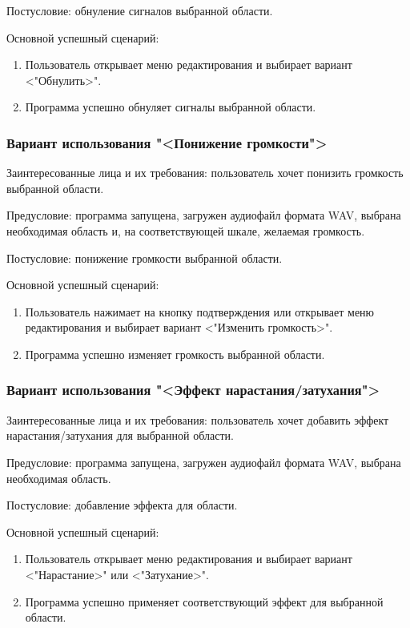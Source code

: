 Постусловие: обнуление сигналов выбранной области.

Основной успешный сценарий:
\begin{enumerate}
	\item Пользователь открывает меню редактирования и выбирает вариант <"Обнулить>".
	\item Программа успешно обнуляет сигналы выбранной области.
\end{enumerate} 

\subsubsection{Вариант использования "<Понижение громкости">}

Заинтересованные лица и их требования: пользователь хочет понизить громкость выбранной области.

Предусловие: программа запущена, загружен аудиофайл формата WAV, выбрана необходимая область и, на соответствующей шкале, желаемая громкость.

Постусловие: понижение громкости выбранной области.

Основной успешный сценарий:
\begin{enumerate}
	\item Пользователь нажимает на кнопку подтверждения или открывает меню редактирования и выбирает вариант <"Изменить громкость>".
	\item Программа успешно изменяет громкость выбранной области.
\end{enumerate} 

\subsubsection{Вариант использования "<Эффект нарастания/затухания">}

Заинтересованные лица и их требования: пользователь хочет добавить эффект нарастания/затухания для выбранной области.

Предусловие: программа запущена, загружен аудиофайл формата WAV, выбрана необходимая область.

Постусловие: добавление эффекта для области.

Основной успешный сценарий:
\begin{enumerate}
	\item Пользователь открывает меню редактирования и выбирает вариант <"Нарастание>" или <"Затухание>".
	\item Программа успешно применяет соответствующий эффект для выбранной области.
\end{enumerate} 

